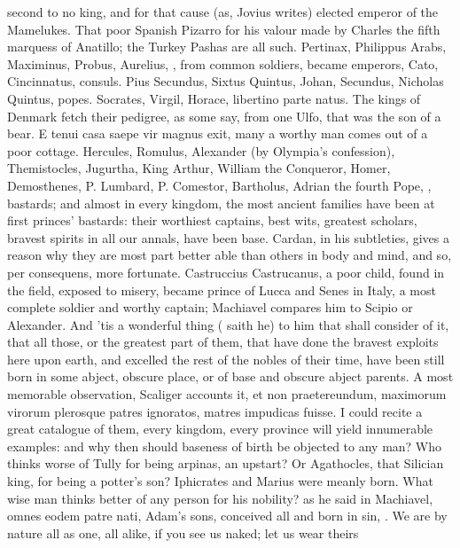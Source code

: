 {second to no king, and for that cause (as, Jovius writes) elected
emperor of the Mamelukes. That poor Spanish Pizarro for his valour made
by Charles the fifth marquess of Anatillo; the Turkey Pashas are all
such. Pertinax, Philippus Arabs, Maximinus, Probus, Aurelius, \etc{}, from
common soldiers, became emperors, Cato, Cincinnatus, \etc{} consuls. Pius
Secundus, Sixtus Quintus, Johan, Secundus, Nicholas Quintus, \etc{} popes.
Socrates, Virgil, Horace, libertino parte natus. The kings of
Denmark fetch their pedigree, as some say, from one Ulfo, that was the
son of a bear. E tenui casa saepe vir magnus exit, many a worthy
man comes out of a poor cottage. Hercules, Romulus, Alexander (by
Olympia's confession), Themistocles, Jugurtha, King Arthur, William the
Conqueror, Homer, Demosthenes, P. Lumbard, P. Comestor, Bartholus,
Adrian the fourth Pope, \etc{}, bastards; and almost in every kingdom, the
most ancient families have been at first princes' bastards: their
worthiest captains, best wits, greatest scholars, bravest spirits in
all our annals, have been base. Cardan, in his subtleties, gives
a reason why they are most part better able than others in body and
mind, and so, per consequens, more fortunate. Castruccius Castrucanus,
a poor child, found in the field, exposed to misery, became prince of
Lucca and Senes in Italy, a most complete soldier and worthy captain;
Machiavel compares him to Scipio or Alexander. And 'tis a wonderful
thing ( saith he) to him that shall consider of it, that all
those, or the greatest part of them, that have done the bravest
exploits here upon earth, and excelled the rest of the nobles of their
time, have been still born in some abject, obscure place, or of base
and obscure abject parents. A most memorable observation,
Scaliger accounts it, et non praetereundum, maximorum virorum
plerosque patres ignoratos, matres impudicas fuisse. I could
recite a great catalogue of them, every kingdom, every province will
yield innumerable examples: and why then should baseness of birth be
objected to any man? Who thinks worse of Tully for being arpinas, an
upstart? Or Agathocles, that Silician king, for being a potter's son?
Iphicrates and Marius were meanly born. What wise man thinks better of
any person for his nobility? as he said in Machiavel, omnes eodem
patre nati, Adam's sons, conceived all and born in sin, \etc{}. We are by
nature all as one, all alike, if you see us naked; let us wear theirs
}

